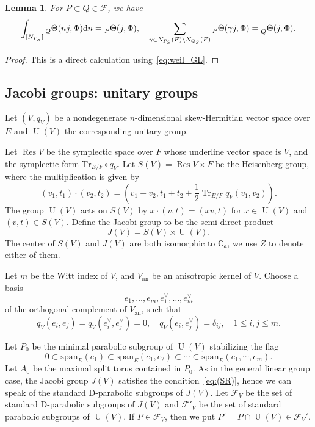 \documentclass[letterpaper,11pt]{amsart}
\newcommand{\G}{\mathbb{G}}
\newcommand{\cF}{\mathcal{F}}
\newcommand{\rd}{\mathrm{d}}
\newcommand{\bs}{\backslash}
\newcommand{\<}{\negthickspace}
\DeclareMathOperator{\Tr}{Tr}
\DeclareMathOperator{\U}{U}
\DeclareMathOperator{\Res}{Res}
\theoremstyle{definition}
\theoremstyle{plain}
\newtheorem{lemma}[definition]{Lemma}
\theoremstyle{remark}
\numberwithin{equation}{section}
\begin{document}
\begin{lemma} \label{lem:property_Theta}
For $P \subset Q \in \cF$, we have
    \[
    \int_{[N_{P_S}]} \prescript{}{Q}{\Theta}(nj,\Phi) \rd n
    = \prescript{}{P}{\Theta}(j,\Phi), \quad
    \sum_{\gamma \in N_{P_S}(F) \bs N_{Q_S}(F)}
    \prescript{}{P}{\Theta}(\gamma j, \Phi) = \prescript{}{Q}{\Theta(j, \Phi)}.
    \]
\end{lemma}


\begin{proof}
This is a direct calculation using~\eqref{eq:weil_GL}.
\end{proof}

\subsection{Jacobi groups: unitary groups}  \label{subsec:u_Jacobi}
Let $(V, q_V)$ be a nondegenerate $n$-dimensional skew-Hermitian vector
space over $E$ and $\U(V)$ the corresponding unitary group.

Let $\Res V$ be the symplectic space over $F$ whose underline vector space is
$V$, and the symplectic form $\mathrm{Tr}_{E/F} \circ q_V$.
Let $S(V) = \Res V \times F$ be the Heisenberg group, where the
multiplication is given by
    \[
    (v_1, t_1) \cdot (v_2, t_2) =
    \left(v_1+v_2, t_1+t_2+ \frac{1}{2} \Tr_{E/F} q_V(v_1,v_2)\right).
    \]
The group $\U(V)$ acts on $S(V)$ by $x \cdot (v,t)=(xv,t)$ for $x \in \U(V)$
and $(v,t) \in S(V)$. Define the Jacobi group to be the semi-direct product
    \[
    \label{eq:Jacobi_group}
    J(V) =  S(V) \rtimes \U(V).
    \]
The center of $S(V)$ and $J(V)$ are both isomorphic to $\G_a$, we use $Z$ to
denote either of them.

Let $m$ be the Witt index of $V$, and $V_{\mathrm{an}}$ be an anisotropic
kernel of $V$. Choose a basis
    \[
    e_1, \hdots, e_m, e_1^\vee, \hdots, e_m^\vee
    \]
of the orthogonal complement of $V_{\mathrm{an}}$, such that
    \[
    q_V(e_i, e_j) = q_V(e_i^\vee, e_j^\vee) = 0, \quad
    q_{V}(e_i, e_j^\vee) = \delta_{ij}, \quad
    1 \leq i, j \leq m.
    \]

Let $P_{0}$ be the minimal parabolic subgroup of $\U(V)$ stabilizing the
flag
    \begin{equation}    \label{eq:maximal_isotropic_flag}
    0 \subset \mathrm{span}_E(e_1)  \subset \mathrm{span}_E(e_1,e_2)
    \subset \cdots \subset \mathrm{span}_E(e_1,\cdots,e_m) .
    \end{equation}
Let $A_{0}$ be the maximal split torus contained in $P_{0}$. As in the
general linear group case, the Jacobi group $J(V)$ satisfies the
condition~\eqref{eq:(SR)}, hence we can speak of the standard D-parabolic
subgroups of $J(V)$. Let $\cF_V$ be the set of standard D-parabolic subgroups
of $J(V)$ and $\cF'_{V}$ be the set of standard parabolic subgroups of $\U(V)$.
If $P \in \cF_{V}$, then we put $P' = P \cap \U(V) \in \cF_V'$.
\end{document}
